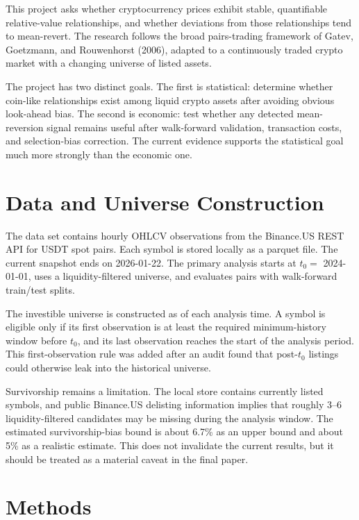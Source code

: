 \documentclass[11pt]{article}
\begin{document}
This project asks whether cryptocurrency prices exhibit stable, quantifiable
relative-value relationships, and whether deviations from those relationships
tend to mean-revert. The research follows the broad pairs-trading framework of
Gatev, Goetzmann, and Rouwenhorst (2006), adapted to a continuously traded
crypto market with a changing universe of listed assets.

The project has two distinct goals. The first is statistical: determine whether
coin-like relationships exist among liquid crypto assets after avoiding obvious
look-ahead bias. The second is economic: test whether any detected
mean-reversion signal remains useful after walk-forward validation,
transaction costs, and selection-bias correction. The current evidence supports
the statistical goal much more strongly than the economic one.

\section{Data and Universe Construction}

The data set contains hourly OHLCV observations from the Binance.US REST API
for USDT spot pairs. Each symbol is stored locally as a parquet file. The
current snapshot ends on 2026-01-22. The primary analysis starts at
\(t_0=\) 2024-01-01, uses a liquidity-filtered universe, and evaluates pairs
with walk-forward train/test splits.

The investible universe is constructed as of each analysis time. A symbol is
eligible only if its first observation is at least the required minimum-history
window before \(t_0\), and its last observation reaches the start of the
analysis period. This first-observation rule was added after an audit found
that post-\(t_0\) listings could otherwise leak into the historical universe.

Survivorship remains a limitation. The local store contains currently listed
symbols, and public Binance.US delisting information implies that roughly
3--6 liquidity-filtered candidates may be missing during the analysis window.
The estimated survivorship-bias bound is about 6.7\% as an upper bound and
about 5\% as a realistic estimate. This does not invalidate the current
results, but it should be treated as a material caveat in the final paper.

\section{Methods}
\end{document}
